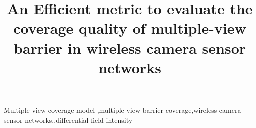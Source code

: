 \documentclass[3p]{elsarticle}
\begin{document}
\begin{frontmatter}

\title{ An Efficient metric to evaluate the coverage quality of multiple-view barrier in wireless camera sensor networks}


\begin{abstract}
\end{abstract}

\begin{keyword}
Multiple-view coverage model \sep multiple-view barrier coverage\sep wireless camera sensor networks\sep \sep differential field intensity
\end{keyword}

\end{frontmatter}
\end{document}
